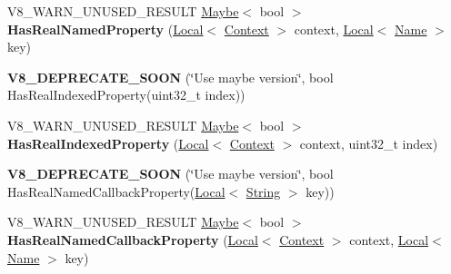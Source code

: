 \begin{DoxyCompactItemize}
\item 
\hypertarget{classv8_1_1Object_ad830b937c7586fe2086b288ea79935c4}{}V8\+\_\+\+W\+A\+R\+N\+\_\+\+U\+N\+U\+S\+E\+D\+\_\+\+R\+E\+S\+U\+L\+T \hyperlink{classv8_1_1Maybe}{Maybe}$<$ bool $>$ {\bfseries Has\+Real\+Named\+Property} (\hyperlink{classv8_1_1Local}{Local}$<$ \hyperlink{classv8_1_1Context}{Context} $>$ context, \hyperlink{classv8_1_1Local}{Local}$<$ \hyperlink{classv8_1_1Name}{Name} $>$ key)\label{classv8_1_1Object_ad830b937c7586fe2086b288ea79935c4}

\item 
\hypertarget{classv8_1_1Object_abd04e5cb82426a70ebea6afec8687c9e}{}{\bfseries V8\+\_\+\+D\+E\+P\+R\+E\+C\+A\+T\+E\+\_\+\+S\+O\+O\+N} (\char`\"{}Use maybe version\char`\"{}, bool Has\+Real\+Indexed\+Property(uint32\+\_\+t index))\label{classv8_1_1Object_abd04e5cb82426a70ebea6afec8687c9e}

\item 
\hypertarget{classv8_1_1Object_a46de2f348f4caafca287328ce385ab56}{}V8\+\_\+\+W\+A\+R\+N\+\_\+\+U\+N\+U\+S\+E\+D\+\_\+\+R\+E\+S\+U\+L\+T \hyperlink{classv8_1_1Maybe}{Maybe}$<$ bool $>$ {\bfseries Has\+Real\+Indexed\+Property} (\hyperlink{classv8_1_1Local}{Local}$<$ \hyperlink{classv8_1_1Context}{Context} $>$ context, uint32\+\_\+t index)\label{classv8_1_1Object_a46de2f348f4caafca287328ce385ab56}

\item 
\hypertarget{classv8_1_1Object_ae1ffb11a0fa7549652d0530c0c4c4ca6}{}{\bfseries V8\+\_\+\+D\+E\+P\+R\+E\+C\+A\+T\+E\+\_\+\+S\+O\+O\+N} (\char`\"{}Use maybe version\char`\"{}, bool Has\+Real\+Named\+Callback\+Property(\hyperlink{classv8_1_1Local}{Local}$<$ \hyperlink{classv8_1_1String}{String} $>$ key))\label{classv8_1_1Object_ae1ffb11a0fa7549652d0530c0c4c4ca6}

\item 
\hypertarget{classv8_1_1Object_a62bde6bea1ce32b30b2152f33a105b14}{}V8\+\_\+\+W\+A\+R\+N\+\_\+\+U\+N\+U\+S\+E\+D\+\_\+\+R\+E\+S\+U\+L\+T \hyperlink{classv8_1_1Maybe}{Maybe}$<$ bool $>$ {\bfseries Has\+Real\+Named\+Callback\+Property} (\hyperlink{classv8_1_1Local}{Local}$<$ \hyperlink{classv8_1_1Context}{Context} $>$ context, \hyperlink{classv8_1_1Local}{Local}$<$ \hyperlink{classv8_1_1Name}{Name} $>$ key)\label{classv8_1_1Object_a62bde6bea1ce32b30b2152f33a105b14}


\end{DoxyCompactItemize}
